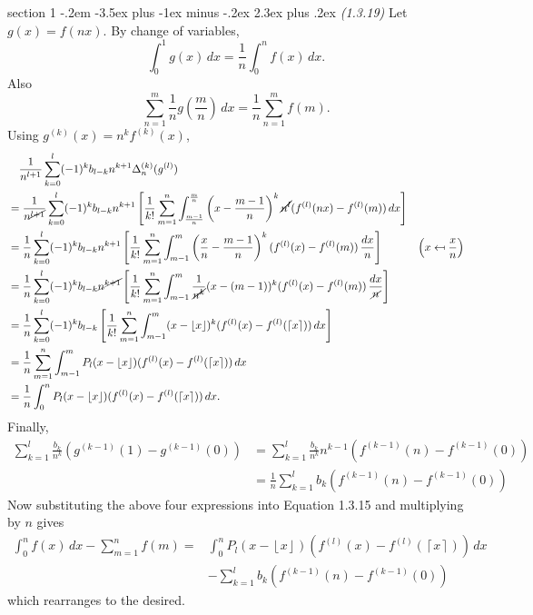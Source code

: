 \documentclass[12pt]{article}
\makeatletter
\theoremstyle{norm}
\newcommand{\rc}[1]{\frac{1}{#1}}
\newcommand{\De}[0]{\Delta}
\newcommand{\ba}[1]{\left[ {#1} \right]}
\newcommand{\pa}[1]{\left( {#1} \right)}
\newcommand{\fl}[1]{\left\lfloor {#1}\right\rfloor}
\newcommand{\ce}[1]{\left\lceil {#1}\right\rceil}
\newcommand{\pf}[2]{\pa{\frac{#1}{#2}}}
\newenvironment{problem}{\@startsection
       {section}
       {1}
       {-.2em}
       {-3.5ex plus -1ex minus -.2ex}
       {2.3ex plus .2ex}
       {\pagebreak[3]%
       \large\bf\noindent{Problem }
       }
       }
       {%
       }
\makeatother
\begin{document}
\begin{problem} {\it (1.3.19)}
Let $g(x)=f(nx)$. By change of variables,
\[
\int_0^1 g(x)\,dx=\rc n\int_0^n f(x)\,dx.
\]
Also
\[
\sum_{n=1}^m \rc ng\pf mn\,dx=\rc n\sum_{n=1}^m f(m).
\]
Using $g^{(k)}(x)=n^kf^{(k)}(x)$,
\begin{align*}
&\quad\rc{n^{l+1}}\sum_{k=0}^l (-1)^k b_{l-k} n^{k+1} \De_n^{(k)}(g^{(l)}) \\
&=\rc{n^{\cancel{l+1}}}\sum_{k=0}^l (-1)^k b_{l-k} n^{k+1}\ba{
\rc{k!}\sum_{m=1}^n \int_{\frac{m-1}{n}}^{\frac mn} \pa{x-
\frac{m-1}{n}
}^k \cancel{n^l}(f^{(l)}(nx)-f^{(l)}(m))\,dx
}\\
&=\rc{n}\sum_{k=0}^l (-1)^k b_{l-k} n^{k+1}\ba{
\rc{k!}\sum_{m=1}^n \int_{m-1}^{m} \pa{
\frac{x}{n}-
\frac{m-1}{n}
}^k (f^{(l)}(x)-f^{(l)}(m))\,\frac{dx}{n}
}&\pa{x\mapsfrom \frac xn}\\
&=\rc{n}\sum_{k=0}^l (-1)^k b_{l-k} \cancel{n^{k+1}}\ba{
\rc{k!}\sum_{m=1}^n \int_{m-1}^{m}\rc{\cancel{n^k}}(x-(m-1))
^k (f^{(l)}(x)-f^{(l)}(m))\,\frac{dx}{\cancel{n}}
}\\
&=\rc{n}\sum_{k=0}^l (-1)^k b_{l-k}\ba{
\rc{k!}\sum_{m=1}^n \int_{m-1}^{m}(x-\fl x)
^k (f^{(l)}(x)-f^{(l)}(\ce x))\,dx
}\\
&=\rc{n}\sum_{m=1}^n \int_{m-1}^{m}P_l(x-\fl x)
(f^{(l)}(x)-f^{(l)}(\ce x))\,dx
\\
&=\rc{n} \int_{0}^{n}P_l(x-\fl x)
(f^{(l)}(x)-f^{(l)}(\ce x))\,dx.
\end{align*}
Finally,
\begin{align*}
\sum_{k=1}^l \frac{b_k}{n^k} (g^{(k-1)}(1)-g^{(k-1)}(0))
&=
\sum_{k=1}^l \frac{b_k}{n^k} n^{k-1}(f^{(k-1)}(n)-f^{(k-1)}(0))\\
&=
\rc n\sum_{k=1}^l b_k(f^{(k-1)}(n)-f^{(k-1)}(0))
\end{align*}
Now substituting the above four expressions into Equation 1.3.15 and multiplying by $n$ gives
\[
\begin{split}
\int_0^n f(x)\,dx -\sum_{m=1}^n f(m)
=&
\int_0^n P_l(x-\fl x) (f^{(l)}(x)-f^{(l)}(\ce x))\,dx\\
&-\sum_{k=1}^l b_k(f^{(k-1)}(n)-f^{(k-1)}(0))
\end{split}\]
which rearranges to the desired.
\end{problem}
\end{document}
